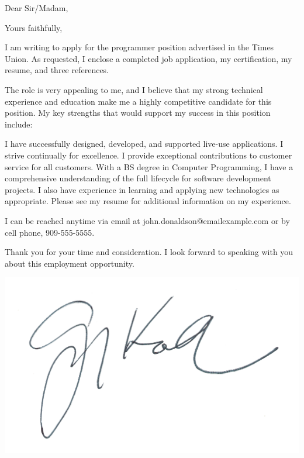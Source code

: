 \documentclass[11pt]{moderncv}
\date{September 26, 2020}
\begin{document}


\opening{Dear Sir/Madam,}



\vspace{-15cm}
\closing{Yours faithfully,}

\makelettertitle


\justify
I am writing to apply for the programmer position advertised in the Times Union. As requested, I enclose a completed job application, my certification, my resume, and three references.

The role is very appealing to me, and I believe that my strong technical experience and education make me a highly competitive candidate for this position. My key strengths that would support my success in this position include:

I have successfully designed, developed, and supported live-use applications.
I strive continually for excellence.
I provide exceptional contributions to customer service for all customers.
With a BS degree in Computer Programming, I have a comprehensive understanding of the full lifecycle for software development projects. I also have experience in learning and applying new technologies as appropriate. Please see my resume for additional information on my experience.

I can be reached anytime via email at john.donaldson@emailexample.com or by cell phone, 909-555-5555.

Thank you for your time and consideration. I look forward to speaking with you about this employment opportunity.




\makeletterclosing
\vspace{-7.75cm}
\includegraphics[width=0.15\linewidth]{Greg_Koch_(signature).png} 
\end{document}
